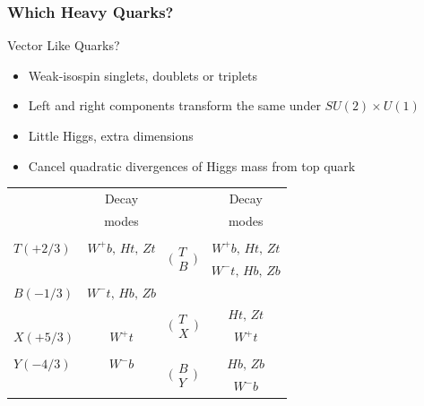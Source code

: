 \documentclass[xcolor=dvipsnames,10pt]{beamer}
\begin{document}
\begin{frame}\frametitle{Which Heavy Quarks?}
\footnotesize\centering

\begin{minipage}{.5\textwidth}
\centering

\alert{Vector Like Quarks?}~\cite{AguilarSaavedra:2009es}
\scriptsize
\begin{itemize}
\item Weak-isospin singlets, doublets or triplets
\item Left and right components transform the same under $SU(2)\times U(1)$
\item Little Higgs, extra dimensions
\item Cancel quadratic divergences of Higgs mass from top quark
\end{itemize}

\end{minipage}\begin{minipage}{.5\textwidth}
\centering

\scriptsize
{\tiny
\begin{tabular}{lc|lc}
\scriptsize\multirow{2}{*}{VLQ} & \scriptsize Decay & \scriptsize\multirow{2}{*}{Doublets} &\scriptsize Decay \\ 
\scriptsize& \scriptsize modes & &\scriptsize modes\\
& & &\\
$T(+2/3)$ & $W^+b,\, Ht,\, Zt$ & \multirow{2}{*}{$\bigg(\begin{array}{c}T \\ B\end{array}\bigg)$} & $W^+b,\, Ht,\, Zt$\\ 
& & & $ W^-t,\, Hb,\, Zb$\\
$B(-1/3)$ & $ W^-t,\, Hb,\, Zb$ & \\
& & \multirow{2}{*}{$\bigg(\begin{array}{c}T \\ X\end{array}\bigg)$} & $Ht,\, Zt$\\
$X(+5/3)$ & $W^+t$ & & $W^+t$\\
& & &\\
$Y(-4/3)$ & $W^-b$ & \multirow{2}{*}{$\bigg(\begin{array}{c}B \\ Y\end{array}\bigg)$} & $Hb,\, Zb$\\
& & & $W^-b$\\
\end{tabular}
}


\end{minipage}
\end{frame}
\end{document}
